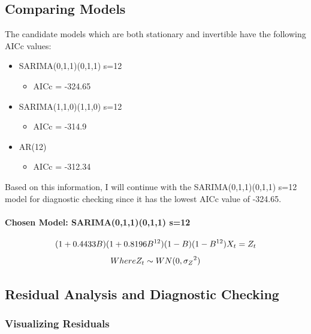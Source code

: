 \documentclass[
  letterpaper,
  DIV=11,
  numbers=noendperiod]{scrartcl}
\let\oldparagraph\paragraph
\renewcommand{\paragraph}[1]{\oldparagraph{#1}\mbox{}}
\providecommand{\tightlist}{%
  \setlength{\itemsep}{0pt}\setlength{\parskip}{0pt}}\usepackage{longtable,booktabs,array}
\begin{document}
\hypertarget{comparing-models}{%
\subsection{Comparing Models}\label{comparing-models}}

The candidate models which are both stationary and invertible have the
following AICc values:

\begin{itemize}
\item
  SARIMA(0,1,1)(0,1,1) s=12

  \begin{itemize}
  \tightlist
  \item
    AICc = -324.65
  \end{itemize}
\item
  SARIMA(1,1,0)(1,1,0) s=12

  \begin{itemize}
  \tightlist
  \item
    AICc = -314.9
  \end{itemize}
\item
  AR(12)

  \begin{itemize}
  \tightlist
  \item
    AICc = -312.34
  \end{itemize}
\end{itemize}

Based on this information, I will continue with the SARIMA(0,1,1)(0,1,1)
s=12 model for diagnostic checking since it has the lowest AICc value of
-324.65.

\hypertarget{chosen-model-sarima011011-s12}{%
\paragraph{Chosen Model: SARIMA(0,1,1)(0,1,1)
s=12}\label{chosen-model-sarima011011-s12}}

\[
(1+0.4433B)(1+0.8196B^{12})(1-B)(1-B^{12}){X_t} = {Z_t} \space \space
\] \[
Where \space {Z_t} \sim WN(0,{\sigma_Z}^2)
\]

\hypertarget{residual-analysis-and-diagnostic-checking}{%
\subsection{Residual Analysis and Diagnostic
Checking}\label{residual-analysis-and-diagnostic-checking}}

\hypertarget{visualizing-residuals}{%
\subsubsection{Visualizing Residuals}\label{visualizing-residuals}}
\end{document}
